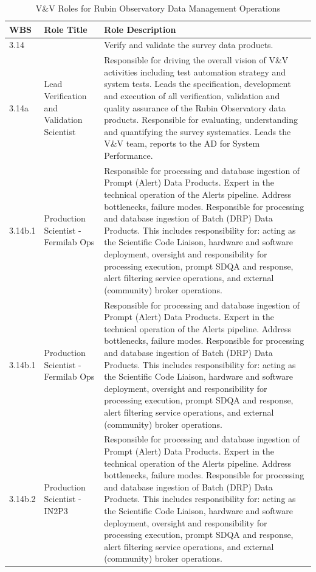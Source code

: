 \normalsize \begin{longtable} {|p{}|p{}|p{}|} \caption{V\&V  Roles for Rubin Observatory Data Management Operations \label{tab:vnvroles}}\\ 
\hline 
\textbf{WBS}&\textbf{Role Title}&\textbf{Role Description} \\ \hline
{3.14}&{}&{Verify and validate the survey data products.} \\ \hline
{3.14a}&{Lead Verification and Validation Scientist}&{Responsible for driving the overall vision of V\&V activities including test automation strategy and system tests. Leads the specification, development and execution of all verification, validation and quality assurance of the Rubin Observatory data products.  Responsible for evaluating, understanding and quantifying the survey systematics. Leads the V\&V team, reports to the AD for System Performance.} \\ \hline
{3.14b.1}&{Production Scientist - Fermilab Ops}&{Responsible for processing and database ingestion of Prompt (Alert) Data Products. Expert in the technical operation of the Alerts pipeline. Address bottlenecks, failure modes. Responsible for processing and database ingestion of Batch (DRP) Data Products. This includes responsibility for: acting as the Scientific Code Liaison, hardware and software deployment, oversight and responsibility for processing execution, prompt SDQA and response, alert filtering service operations, and external (community) broker operations.} \\ \hline
{3.14b.1}&{Production Scientist - Fermilab Ops}&{Responsible for processing and database ingestion of Prompt (Alert) Data Products. Expert in the technical operation of the Alerts pipeline. Address bottlenecks, failure modes. Responsible for processing and database ingestion of Batch (DRP) Data Products. This includes responsibility for: acting as the Scientific Code Liaison, hardware and software deployment, oversight and responsibility for processing execution, prompt SDQA and response, alert filtering service operations, and external (community) broker operations.} \\ \hline
{3.14b.2}&{Production Scientist - IN2P3}&{Responsible for processing and database ingestion of Prompt (Alert) Data Products. Expert in the technical operation of the Alerts pipeline. Address bottlenecks, failure modes. Responsible for processing and database ingestion of Batch (DRP) Data Products. This includes responsibility for: acting as the Scientific Code Liaison, hardware and software deployment, oversight and responsibility for processing execution, prompt SDQA and response, alert filtering service operations, and external (community) broker operations.} \\ \hline

\end{longtable}
